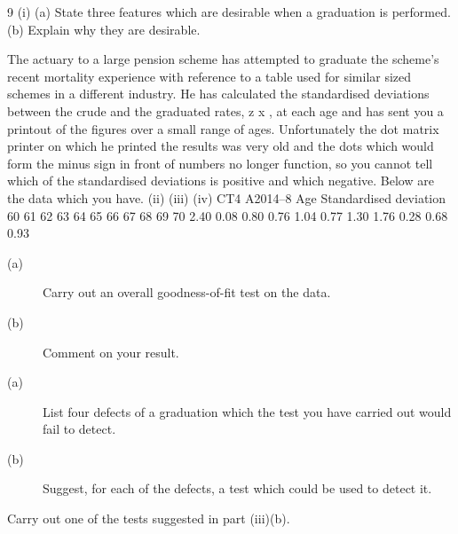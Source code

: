 \documentclass[a4paper,12pt]{article}
\begin{document}
\begin{enumerate}
9
(i)
(a) State three features which are desirable when a graduation is performed.
(b) Explain why they are desirable.

The actuary to a large pension scheme has attempted to graduate the scheme’s recent
mortality experience with reference to a table used for similar sized schemes in a
different industry. He has calculated the standardised deviations between the crude
and the graduated rates, z x , at each age and has sent you a printout of the figures over
a small range of ages. Unfortunately the dot matrix printer on which he printed the
results was very old and the dots which would form the minus sign in front of
numbers no longer function, so you cannot tell which of the standardised deviations is
positive and which negative. Below are the data which you have.
(ii)
(iii)
(iv)
CT4 A2014–8
Age Standardised
deviation
60
61
62
63
64
65
66
67
68
69
70 2.40
0.08
0.80
0.76
1.04
0.77
1.30
1.76
0.28
0.68
0.93
\begin{description}
\item[(a)] Carry out an overall goodness-of-fit test on the data.
\item[(b)] Comment on your result.
\item[(a)] List four defects of a graduation which the test you have carried out
would fail to detect.
\item[(b)] Suggest, for each of the defects, a test which could be used to detect it.
\end{description}
Carry out one of the tests suggested in part (iii)(b).



\end{enumerate}
\end{document}

